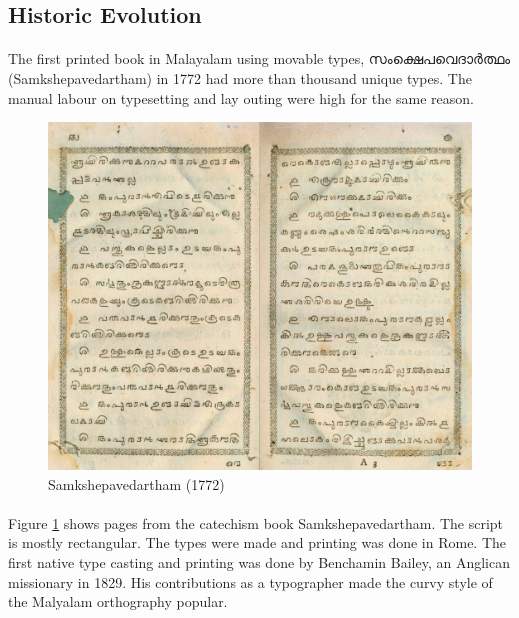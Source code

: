 \documentclass[10pt]{article}
\begin{document}
\subsection{Historic Evolution}

\paragraph{}
The first printed book in Malayalam using movable types, \begingroup \manjari സംക്ഷെപവെദാർത്ഥം \endgroup (Samkshepavedartham) in 1772 had more than thousand unique types. \cite{babucherian} The manual labour on typesetting and lay outing were high for the same reason. 

\begin{figure}[ht]
  \centering
   \includegraphics[width=\textwidth]{images/samkshepavedartham1772.png}
     \caption{Samkshepavedartham (1772)}
	\label{Samkshepam}
\end{figure}

\paragraph{}
Figure \ref{Samkshepam} shows pages from the catechism book  Samkshepavedartham.  The script is mostly rectangular. The types were made and printing was done in Rome. The first native type casting and printing was done by Benchamin Bailey, an Anglican missionary in 1829.   His contributions as a typographer made the curvy style of the  Malyalam orthography popular.\cite{gupthannair} 
\end{document}
